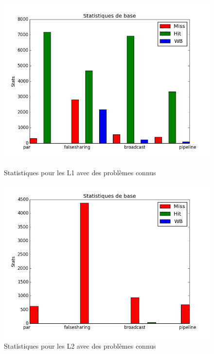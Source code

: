 \begin{figure}[H]
   \begin{minipage}[l]{.46\textwidth}
     \includegraphics[scale=0.35]{images/stats_L1.png}
     \caption{\label{img:inclusifs1} Statistiques pour les L1 avec des problèmes connus}
   \end{minipage} \hfill
   \begin{minipage}[r]{.46\textwidth}
     \includegraphics[scale=0.35]{images/stats_L2.png}
     \caption{\label{img:inclusifs2} Statistiques pour les L2 avec des problèmes connus}
   \end{minipage}
\end{figure}

